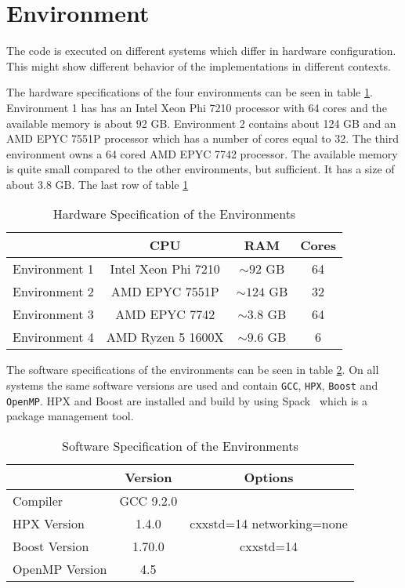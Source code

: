 \section{Environment}
  The code is executed on different systems which differ in hardware configuration.
  This might show different behavior of the implementations in different contexts.

The hardware specifications of the four environments can be seen in table \ref{tab:hardEnv}.
Environment 1 has has an Intel Xeon Phi 7210 processor with 64 cores and the available memory is about 92 GB.
Environment 2 contains about 124 GB and an AMD EPYC 7551P processor which has a number of cores equal to 32.
The third environment owns a 64 cored AMD EPYC 7742 processor. The available memory is quite small compared to the other environments, but sufficient.
It has a size of about 3.8 GB.
The last row of table \ref{tab:hardEnv} 
\begin{table}
\centering
\caption{Hardware Specification of the Environments}
\begin{tabular}[h]{l c c c}
 & CPU & RAM & Cores  \\\hline
Environment 1 & Intel Xeon Phi 7210 & $\sim 92$ GB & 64 \\
Environment 2 & AMD EPYC 7551P & $\sim 124$ GB & 32 \\
Environment 3 & AMD EPYC 7742 & $\sim 3.8$ GB & 64 \\
Environment 4 & AMD Ryzen 5 1600X & $\sim 9.6$ GB & 6 \\\hline
\end{tabular}
\label{tab:hardEnv}
\end{table}

The software specifications of the environments can be seen in table \ref{tab:softEnv}.
On all systems the same software versions are used and contain \texttt{GCC}, \texttt{HPX}, \texttt{Boost} and \texttt{OpenMP}.
HPX and Boost are installed and build by using Spack~\cite{Spack.2020} which is a package management tool.
\begin{table}
\centering
\caption{Software Specification of the Environments}
\begin{tabular}[h]{l c c}
\centering
 & Version & Options\\\hline
Compiler & GCC 9.2.0 & \\
HPX Version & 1.4.0 & cxxstd=14 networking=none  \\
Boost Version & 1.70.0 & cxxstd=14 \\
OpenMP Version & 4.5 & \\\hline
\end{tabular}
\label{tab:softEnv}
\end{table}